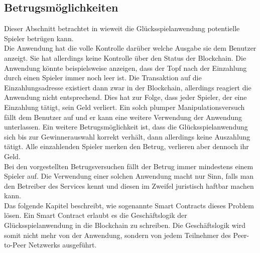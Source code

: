 \subsection{Betrugsmöglichkeiten}
Dieser Abschnitt betrachtet in wieweit die Glücksspielanwendung potentielle Spieler betrügen kann.\\
Die Anwendung hat die volle Kontrolle darüber welche Ausgabe sie dem Benutzer anzeigt. Sie hat allerdings keine Kontrolle über den Status der Blockchain. Die Anwendung könnte beispielsweise anzeigen, dass der Topf nach der Einzahlung durch einen Spieler immer noch leer ist. Die Transaktion auf die Einzahlungsadresse existiert dann zwar in der Blockchain, allerdings reagiert die Anwendung nicht entsprechend. Dies hat zur Folge, dass jeder Spieler, der eine Einzahlung tätigt, sein Geld verliert. Ein solch plumper Manipulationsversuch fällt dem Benutzer auf und er kann eine weitere Verwendung der Anwendung unterlassen. Ein weitere Betrugsmöglichkeit ist, dass die Glücksspielanwendung sich bis zur Gewinnerauswahl korrekt verhält, dann allerdings keine Auszahlung tätigt. Alle einzahlenden Spieler merken den Betrug, verlieren aber dennoch ihr Geld.\\
Bei den vorgestellten Betrugsversuchen fällt der Betrug immer mindestens einem Spieler auf. Die Verwendung einer solchen Anwendung macht nur Sinn, falls man den Betreiber des Services kennt und diesen im Zweifel juristisch haftbar machen kann.\\
Das folgende Kapitel beschreibt, wie sogenannte Smart Contracts dieses Problem lösen. Ein Smart Contract erlaubt es die Geschäftslogik der Glücksspielanwendung in die Blockchain zu schreiben. Die Geschäftslogik wird somit nicht mehr von der Anwendung, sondern von jedem Teilnehmer des Peer-to-Peer Netzwerks ausgeführt.
